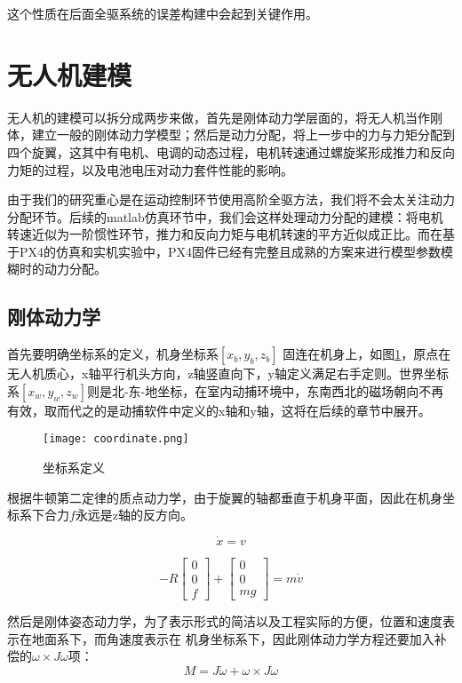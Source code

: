 这个性质在后面全驱系统的误差构建中会起到关键作用。
  \section{无人机建模}
  无人机的建模可以拆分成两步来做，首先是刚体动力学层面的，将无人机当作刚体，建立一般的刚体动力学模型；然后是动力分配，将上一步中的力与力矩分配到四个旋翼，这其中有电机、电调的动态过程，电机转速通过螺旋桨形成推力和反向力矩的过程，以及电池电压对动力套件性能的影响。
  
  由于我们的研究重心是在运动控制环节使用高阶全驱方法，我们将不会太关注动力分配环节。后续的matlab仿真环节中，我们会这样处理动力分配的建模：将电机转速近似为一阶惯性环节，推力和反向力矩与电机转速的平方近似成正比。而在基于PX4的仿真和实机实验中，PX4固件已经有完整且成熟的方案来进行模型参数模糊时的动力分配。


    \subsection{刚体动力学}
    首先要明确坐标系的定义，机身坐标系$[x_b,y_b,z_b]$ 固连在机身上，如图\ref{fig:1}，原点在无人机质心，x轴平行机头方向，z轴竖直向下，y轴定义满足右手定则。世界坐标系$[x_w,y_w,z_w]$则是北-东-地坐标，在室内动捕环境中，东南西北的磁场朝向不再有效，取而代之的是动捕软件中定义的x轴和y轴，这将在后续的章节中展开。

    \begin{figure}[!h]
      \centering
      \texttt{[image: coordinate.png]}
      \caption{坐标系定义}
      \label{fig:1}
    \end{figure}
    根据牛顿第二定律的质点动力学，由于旋翼的轴都垂直于机身平面，因此在机身坐标系下合力$f$永远是z轴的反方向。

  \begin{equation}
    \dot x=v
  \end{equation}

  \begin{equation}
    -R \begin{bmatrix} 0\\ 0\\ f \end{bmatrix}+\begin{bmatrix} 0\\ 0\\ mg\end{bmatrix}=m \dot v 
    \label{equ:a}
  \end{equation}

    然后是刚体姿态动力学，为了表示形式的简洁以及工程实际的方便，位置和速度表示在地面系下，而角速度表示在
    机身坐标系下，因此刚体动力学方程还要加入补偿的$\omega \times J \omega$项：
  \begin{equation}
    M=J \dot\omega +\omega \times J \omega
    \label{equ:M}
  \end{equation}

